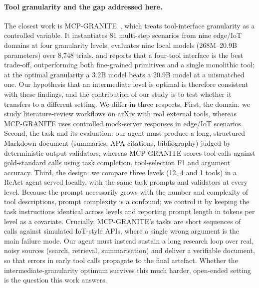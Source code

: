 \paragraph{Tool granularity and the gap addressed here.}
The closest work is MCP-GRANITE~\citep{paschalides2026granite}, which treats tool-interface granularity as a controlled variable. It instantiates 81 multi-step scenarios from nine edge/IoT domains at four granularity levels, evaluates nine local models (268M--20.9B parameters) over 8{,}748 trials, and reports that a four-tool interface is the best trade-off, outperforming both fine-grained primitives and a single monolithic tool; at the optimal granularity a 3.2B model beats a 20.9B model at a mismatched one. Our hypothesis that an intermediate level is optimal is therefore consistent with these findings, and the contribution of our study is to test whether it transfers to a different setting. We differ in three respects. First, the domain: we study literature-review workflows on arXiv with real external tools, whereas MCP-GRANITE uses controlled mock-server responses in edge/IoT scenarios. Second, the task and its evaluation: our agent must produce a long, structured Markdown document (summaries, APA citations, bibliography) judged by deterministic output validators, whereas MCP-GRANITE scores tool calls against gold-standard calls using task completion, tool-selection F1 and argument accuracy. Third, the design: we compare three levels (12, 4 and 1 tools) in a ReAct agent served locally, with the same task prompts and validators at every level. Because the prompt necessarily grows with the number and complexity of tool descriptions, prompt complexity is a confound; we control it by keeping the task instructions identical across levels and reporting prompt length in tokens per level as a covariate. Crucially, MCP-GRANITE's tasks are short sequences of calls against simulated IoT-style APIs, where a single wrong argument is the main failure mode. Our agent must instead sustain a long research loop over real, noisy sources (search, retrieval, summarisation) and deliver a verifiable document, so that errors in early tool calls propagate to the final artefact. Whether the intermediate-granularity optimum survives this much harder, open-ended setting is the question this work answers.
